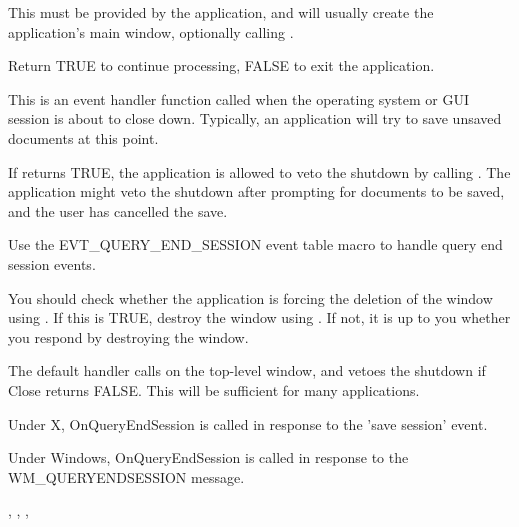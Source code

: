 \label{wxapponinit}


This must be provided by the application, and will usually create the
application's main window, optionally calling .

Return TRUE to continue processing, FALSE to exit the application.

\label{wxapponqueryendsession}


This is an event handler function called when the operating system or GUI session is
about to close down. Typically, an application will try to save unsaved documents
at this point.

If  returns TRUE, the application
is allowed to veto the shutdown by calling .
The application might veto the shutdown after prompting for documents to be saved, and the
user has cancelled the save.

Use the EVT\_QUERY\_END\_SESSION event table macro to handle query end session events.

You should check whether the application is forcing the deletion of the window
using . If this is TRUE,
destroy the window using .
If not, it is up to you whether you respond by destroying the window.

The default handler calls  on the top-level window,
and vetoes the shutdown if Close returns FALSE. This will be sufficient for many applications.


Under X, OnQueryEndSession is called in response to the 'save session' event.

Under Windows, OnQueryEndSession is called in response to the WM\_QUERYENDSESSION message.


,\rtfsp
{},\rtfsp
{},\rtfsp
{}

\label{wxappprocessmessage}

